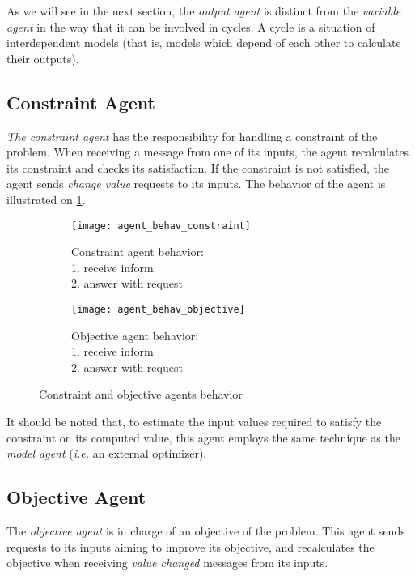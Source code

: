 As we will see in the next section, the \emph{output agent} is distinct from the \emph{variable agent} in the way that it can be involved in cycles. A cycle is a situation of interdependent models (that is, models which depend of each other to calculate their outputs).

\subsection{Constraint Agent}
 \emph{The constraint agent} has the responsibility for handling a constraint of the problem. When receiving a message from one of its inputs, the agent recalculates its constraint and checks its satisfaction. If the constraint is not satisfied, the agent sends \emph{change value} requests to its inputs. The behavior of the agent is illustrated on \figurename{} \ref{agent_behav_constraint}.
 
\begin{figure}
\centering
\begin{subfigure}{0.3\textwidth}
	\texttt{[image: agent\_behav\_constraint]}
	\caption{Constraint agent behavior:\\1. receive inform\\2. answer with 				request}\label{agent_behav_constraint}
\end{subfigure}
\qquad
\begin{subfigure}{0.3\textwidth}
	\texttt{[image: agent\_behav\_objective]}
	\caption{Objective agent behavior:\\1. receive inform\\2. answer with 				request}\label{agent_behav_objective}
\end{subfigure}
\caption{Constraint and objective agents behavior}\label{agent_behav_constraint_and_objective}
\end{figure}

It should be noted that, to estimate the input values required to satisfy the constraint on its computed value, this agent employs the same technique as the \emph{model agent} (\textit{i.e.} an external optimizer).

\subsection{Objective Agent}
The \emph{objective agent} is in charge of an objective of the problem. This agent sends requests to its inputs aiming to improve its objective, and recalculates the objective when receiving \emph{value changed} messages from its inputs.

